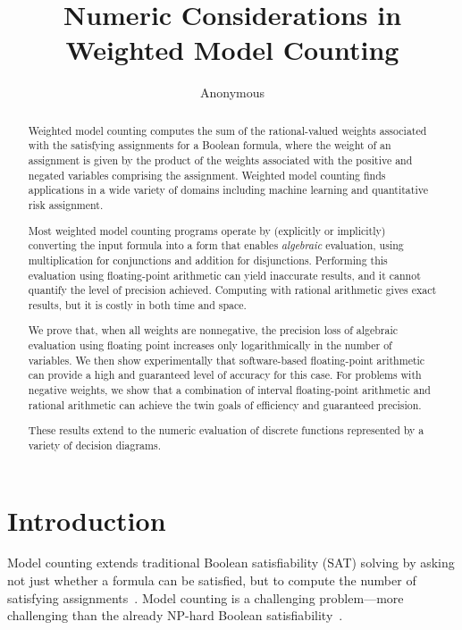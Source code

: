 \documentclass[letterpaper,USenglish,cleveref, autoref, thm-restate]{lipics-v2021}
\title{Numeric Considerations in Weighted Model Counting}
\author{Anonymous}{Unknown Institution}{}{}{}
\begin{document}
\maketitle

\begin{abstract}
 Weighted model counting computes the sum of the rational-valued weights
  associated with the satisfying assignments for a Boolean formula,
  where the weight of an assignment is given by the product of the
  weights associated with the positive and negated variables
  comprising the assignment.  Weighted model counting finds
  applications in a wide variety of domains including machine learning
  and quantitative risk assignment.

  Most weighted model counting programs operate by (explicitly or
  implicitly) converting the input formula into a form that enables
  \emph{algebraic} evaluation, using multiplication for conjunctions
  and addition for disjunctions.  Performing this evaluation using
  floating-point arithmetic can yield inaccurate results, and it
  cannot quantify the level of precision achieved.  Computing with
  rational arithmetic gives exact results, but it is costly in both
  time and space.

  We prove that, when all weights are nonnegative, the precision loss of
  algebraic evaluation using floating point increases only
  logarithmically in the number of variables.  We then show experimentally
  that software-based floating-point arithmetic can provide
  a high and guaranteed level of accuracy for this case.  For problems
  with negative weights, we show that a combination of interval
  floating-point arithmetic and rational arithmetic can achieve the
  twin goals of efficiency and guaranteed precision.

  These results extend to the numeric evaluation of discrete functions represented by a variety of decision diagrams.

\end{abstract}

\section{Introduction}

Model counting extends traditional Boolean satisfiability (SAT) solving by
asking not just whether a formula can be satisfied, but to compute the
number of satisfying assignments~\cite{gomes:hs:2009}.  Model counting is a challenging
problem---more challenging than the already NP-hard Boolean
satisfiability~\cite{valiant:siam:1979}.
\end{document}
